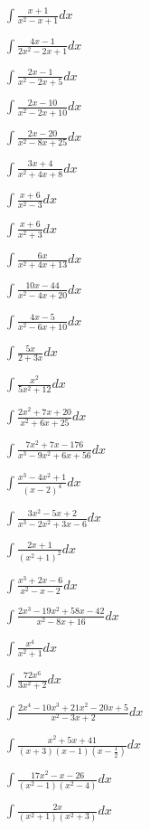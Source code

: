 \begin{multicols}{2}
$\displaystyle \int \frac{x+1}{x^2-x+1}dx$

$\displaystyle \int \frac{4x-1}{2x^2-2x+1}dx$

$\displaystyle \int \frac{2x-1}{x^2-2x+5}dx$

$\displaystyle \int \frac{2x-10}{x^2-2x+10}dx$

$\displaystyle \int \frac{2x-20}{x^2-8x+25}dx$

$\displaystyle \int \frac{3x+4}{x^2+4x+8}dx$

$\displaystyle \int \frac{x+6}{x^2-3}dx$

$\displaystyle \int \frac{x+6}{x^2+3}dx$

$\displaystyle \int \frac{6x}{x^2+4x+13}dx$

$\displaystyle \int \frac{10x-44}{x^2-4x+20}dx$

$\displaystyle \int \frac{4x-5}{x^2-6x+10}dx$

$\displaystyle \int \frac{5x}{2+3x}dx$

$\displaystyle \int \frac{x^2}{5x^2+12}dx$

$\displaystyle \int \frac{2x^2+7x+20}{x^2+6x+25}dx$

$\displaystyle \int \frac{7x^2+7x-176}{x^3-9x^2+6x+56}dx$

$\displaystyle \int \frac{x^3-4x^2+1}{(x-2)^4}dx$

$\displaystyle \int \frac{3x^2-5x+2}{x^3-2x^2+3x-6}dx$

$\displaystyle \int \frac{2x+1}{(x^2+1)^2}dx$

$\displaystyle \int \frac{x^3+2x-6}{x^2-x-2}dx$

$\displaystyle \int \frac{2x^3-19x^2+58x-42}{x^2-8x+16}dx$

$\displaystyle \int \frac{x^4}{x^2+1}dx$

$\displaystyle \int \frac{72x^6}{3x^2+2}dx$

$\displaystyle \int \frac{2x^4-10x^3+21x^2-20x+5}{x^2-3x+2}dx$

$\displaystyle \int \frac{x^2+5x+41}{(x+3)(x-1)(x-\frac{1}{2})}dx$

$\displaystyle \int \frac{17x^2-x-26}{(x^2-1)(x^2-4)}dx$

$\displaystyle \int \frac{2x}{(x^2+1)(x^2+3)}dx$


\end{multicols}
